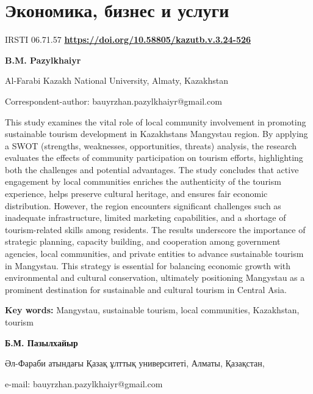 \let\cleardoublepage\clearpage
\part{Экономика, бизнес и услуги}
IRSTI 06.71.57
\hfill {\bfseries \href{https://doi.org/10.58805/kazutb.v.3.24-526}{https://doi.org/10.58805/kazutb.v.3.24-526}}


\begin{center}
{\bfseries B.M. Pazylkhaiyr}

Al-Farabi Kazakh National University, Almaty, Kazakhstan
\end{center}

\envelope Correspondent-author: bauyrzhan.pazylkhaiyr@gmail.com

This study examines the vital role of local community involvement in
promoting sustainable tourism development in
Kazakhstan\textquotesingle s Mangystau region. By applying a SWOT
(strengths, weaknesses, opportunities, threats) analysis, the research
evaluates the effects of community participation on tourism efforts,
highlighting both the challenges and potential advantages. The study
concludes that active engagement by local communities enriches the
authenticity of the tourism experience, helps preserve cultural
heritage, and ensures fair economic distribution. However, the region
encounters significant challenges such as inadequate infrastructure,
limited marketing capabilities, and a shortage of tourism-related skills
among residents. The results underscore the importance of strategic
planning, capacity building, and cooperation among government agencies,
local communities, and private entities to advance sustainable tourism
in Mangystau. This strategy is essential for balancing economic growth
with environmental and cultural conservation, ultimately positioning
Mangystau as a prominent destination for sustainable and cultural
tourism in Central Asia.

{\bfseries Key words:} Mangystau, sustainable tourism, local communities,
Kazakhstan, tourism


\begin{center}
{\bfseries Б.М. Пазылхайыр}

Әл-Фараби атындағы Қазақ ұлттық университеті, Алматы, Қазақстан,

e-mail: bauyrzhan.pazylkhaiyr@gmail.com
\end{center}

